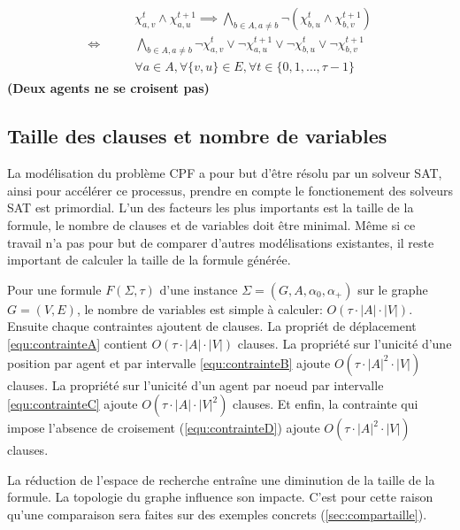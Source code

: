 \documentclass[french, 12pt, letterpaper]{article}
\theoremstyle{definition}
\theoremstyle{proposition}
\theoremstyle{example}
\begin{document}
\begin{itemize}
            \begin{align}
                \label{equ:contrainteD}
                \begin{split}
                    &\chi_{a, v}^t \land \chi_{a, u}^{t+1} \implies \bigwedge_{b \in A, a \neq b} \lnot (\chi_{b, u}^t \land \chi_{b, v}^{t+1})
                    \\\iff \qquad &\bigwedge_{b \in A, a \neq b} \lnot \chi_{a, v}^t \lor \lnot \chi_{a, u}^{t+1} \lor \lnot \chi_{b, u}^t \lor \lnot \chi_{b, v}^{t+1}
                    \\&\forall a \in A, \forall \{v, u\} \in E, \forall t \in \{0, 1, \ldots, \tau-1\}
                \end{split}
            \end{align}
            \textbf{(Deux agents ne se croisent pas)}
    \end{itemize}

    \subsection{Taille des clauses et nombre de variables}
    \label{sec:tailleclause}

    La modélisation du problème CPF a pour but d'être résolu par un solveur SAT, ainsi pour accélérer ce processus, prendre en compte le fonctionement
    des solveurs SAT est primordial. L'un des facteurs les plus importants est la taille de la formule, le nombre de clauses et de variables doit être minimal.
    Même si ce travail n'a pas pour but de comparer d'autres modélisations existantes, il reste important de calculer la taille de la formule générée.

    Pour une formule $F(\Sigma, \tau)$ d'une instance $\Sigma=( G, A, \alpha_0, \alpha_+)$ sur le graphe $G = ( V, E )$, 
    le nombre de variables est simple à calculer: $O(\tau \cdot |A| \cdot |V|)$. 
    Ensuite chaque contraintes ajoutent de clauses.
    La propriét de déplacement \ref{equ:contrainteA} contient $O(\tau \cdot |A| \cdot |V|)$ clauses.
    La propriété sur l'unicité d'une position par agent et par intervalle \ref{equ:contrainteB} ajoute $O(\tau \cdot |A|^2 \cdot |V|)$ clauses.
    La propriété sur l'unicité d'un agent par noeud par intervalle \ref{equ:contrainteC} ajoute $O(\tau \cdot |A| \cdot |V|^2)$ clauses.
    Et enfin, la contrainte qui impose l'absence de croisement (\ref{equ:contrainteD}) ajoute $O(\tau \cdot |A|^2 \cdot |V|)$ clauses.

    La réduction de l'espace de recherche entraîne une diminution de la taille de la formule.
    La topologie du graphe influence son impacte. 
    C'est pour cette raison qu'une comparaison sera faites sur des exemples concrets (\ref{sec:compartaille}). 
\end{document}
